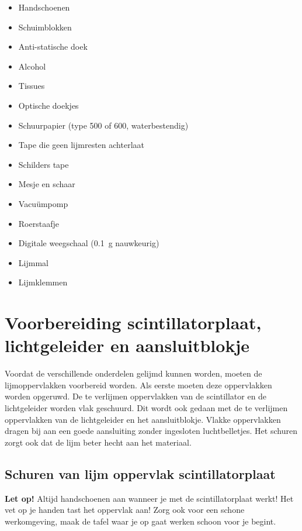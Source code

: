 \begin{itemize}
    \item Handschoenen
    \item Schuimblokken
    \item Anti-statische doek
    \item Alcohol
    \item Tissues
    \item Optische doekjes
    \item Schuurpapier (type 500 of 600, waterbestendig)
    \item Tape die geen lijmresten achterlaat
    \item Schilders tape
    \item Mesje en schaar
    \item Vacuümpomp
    \item Roerstaafje
    \item Digitale weegschaal (\SI{0.1}{\gram} nauwkeurig)
    \item Lijmmal
    \item Lijmklemmen
\end{itemize}


\section{Voorbereiding scintillatorplaat, lichtgeleider en aansluitblokje}

Voordat de verschillende onderdelen gelijmd kunnen worden, moeten de lijmoppervlakken voorbereid worden. Als eerste moeten deze oppervlakken worden opgeruwd. De te verlijmen oppervlakken van de scintillator en de lichtgeleider worden vlak geschuurd. Dit wordt ook gedaan met de te verlijmen oppervlakken van de lichtgeleider en het aansluitblokje. Vlakke oppervlakken dragen bij aan een goede aansluiting zonder ingesloten luchtbelletjes. Het schuren zorgt ook dat de lijm beter hecht aan het materiaal.


\subsection{Schuren van lijm oppervlak scintillatorplaat}

\textbf{Let op!} Altijd handschoenen aan wanneer je met de
scintillatorplaat werkt! Het vet op je handen tast het oppervlak aan! Zorg ook voor een schone werkomgeving, maak de tafel waar je op gaat werken schoon voor je begint.

